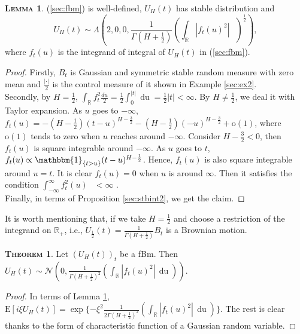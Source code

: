 \documentclass[a4paper, twoside, 11pt]{article}
\theoremstyle{definition}
\newtheorem{theorem}[definition]{\scshape Theorem}
\newtheorem{lemma}[definition]{\scshape Lemma}
\begin{document}
  \begin{lemma}
	(\ref{sec:fbm}) is well-defined, $U_H(t)$ has stable distribution and 
	\begin{equation*}
	  U_H(t) \sim \Lambda(2, 0, 0, \frac{1}{\Gamma(H+\frac{1}{2})}(\int_{\mathbb{R}} |f_t(u)^2|\, \mathop{\frac{du}{2}})^\frac{1}{2}),
	\end{equation*}
	where $f_t(u)$ is the integrand of integral of $U_H(t)$ in (\ref{sec:fbm}).
	\label{sec:l2}
  \end{lemma}
  \begin{proof}
	Firstly, $B_t$ is Gaussian and symmetric stable random measure with zero mean and $\frac{|\cdot|}{2}$ is the control measure of it shown in Example \ref{sec:ex2}. \\
	Secondly, by $H=\frac{1}{2}$, $\int_{\mathbb{R}} f_t^2\frac{du}{2} = \frac{1}{2}\int_{0}^{|t|} \mathop{du} = \frac{1}{2}|t| < \infty$. By $H \neq \frac{1}{2}$, we deal it with Taylor expansion. As $u$ goes to $-\infty$, $f_t(u) = -(H-\frac{1}{2})(t-u)^{H-\frac{3}{2}}-(H-\frac{1}{2})(-u)^{H-\frac{3}{2}} + \mathrm{o}(1)$, where $\mathrm{o}(1)$ tends to zero when $u$ reaches around $-\infty$. Consider $H-\frac{3}{2} < 0$, then $f_t(u)$ is square integrable around $-\infty$. As $u$ goes to $t$, $f_t(u) \propto \mathbbm{1}_{\{t > u\}}(t-u)^{H-\frac{1}{2}}$. Hence, $f_t(u)$ is also square integrable around $u=t$. It is clear $f_t(u)=0$ when $u$ is around $\infty$. Then it satisfies the condition $\int_{-\infty}^{\infty}f_t^2(u)\,\mathop{\frac{du}{2}} < \infty$ .\\
	Finally, in terms of Proposition \ref{sec:stbint2}, we get the claim.
  \end{proof}
  It is worth mentioning that, if we take $H=\frac{1}{2}$ and choose a restriction of the integrand on $\mathbb{R}_+$, i.e., $U_{\frac{1}{2}}(t) = \frac{1}{\Gamma(H+\frac{1}{2})} B_t$ is a Brownian motion. 	
  \begin{theorem}
	Let $(U_H(t))_t$ be a fBm. Then $U_H(t) \sim \mathcal{N}(0, \frac{1}{\Gamma(H+\frac{1}{2})^2}(\int_{\mathbb{R}} |f_t(u)^2|\, \mathop{du}))$.
	\label{sec:the1}
  \end{theorem}
  \begin{proof}
	In terms of Lemma \ref{sec:l2}, $\mathrm{E}[i\xi U_H(t)] = \exp\{-\xi^2 \frac{1}{2\Gamma(H+\frac{1}{2})^2}(\int_{\mathbb{R}} |f_t(u)^2|\, \mathop{du})\}$. The rest is clear thanks to the form of characteristic function of a Gaussian random variable.
  \end{proof}
\end{document}
